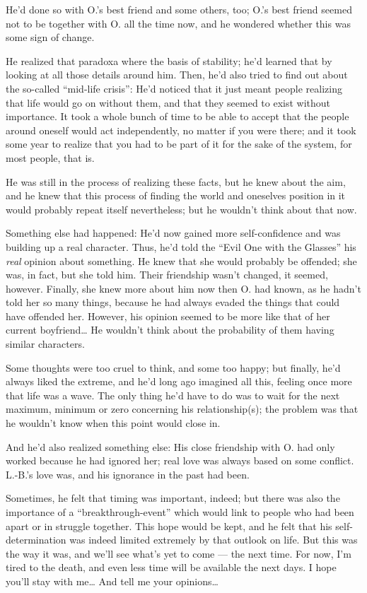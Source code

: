 He'd done so with O.'s best friend and some others, too; O.'s best friend seemed not to be together with O. all the time now, and he wondered whether this was some sign of change.

He realized that paradoxa where the basis of stability; he'd learned that by looking at all those details around him. Then, he'd also tried to find out about the so-called \enquote{mid-life crisis}: He'd noticed that it just meant people realizing that life would go on without them, and that they seemed to exist without importance. It took a whole bunch of time to be able to accept that the people around oneself would act independently, no matter if you were there; and it took some year to realize that you had to be part of it for the sake of the system, for most people, that is.

He was still in the process of realizing these facts, but he knew about the aim, and he knew that this process of finding the world and oneselves position in it would probably repeat itself nevertheless; but he wouldn't think about that now.

Something else had happened: He'd now gained more self-confidence and was building up a real character. Thus, he'd told the \enquote{Evil One with the Glasses} his \emph{real} opinion about something. He knew that she would probably be offended; she was, in fact, but she told him. Their friendship wasn't changed, it seemed, however. Finally, she knew more about him now then O. had known, as he hadn't told her so many things, because he had always evaded the things that could have offended her. However, his opinion seemed to be more like that of her current boyfriend\dots{}
He wouldn't think about the probability of them having similar characters.

Some thoughts were too cruel to think, and some too happy; but finally, he'd always liked the extreme, and he'd long ago imagined all this, feeling once more that life was a wave. The only thing he'd have to do was to wait for the next maximum, minimum or zero concerning his relationship(s); the problem was that he wouldn't know when this point would close in.

And he'd also realized something else: His close friendship with O. had only worked because he had ignored her; real love was always based on some conflict. 
L.-B.'s love was, and his ignorance in the past had been.

Sometimes, he felt that timing was important, indeed; but there was also the importance of a \enquote{breakthrough-event} which would link to people who had been apart or in struggle together. 
This hope would be kept, and he felt that his self-determination was indeed limited extremely by that outlook on life. But this was the way it was, and we'll see what's yet to come --- the next time. 
For now, I'm tired to the death, and even less time will be available the next days. 
I hope you'll stay with me\dots{}
And tell me your opinions\dots{}

